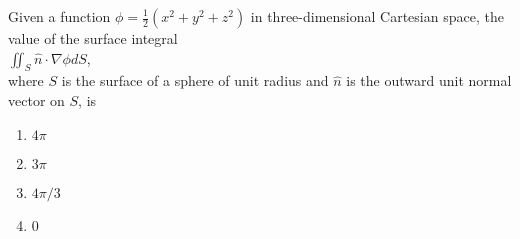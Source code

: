     \item Given a function $ \phi = \frac{1}{2}(x^{2} + y^{2} + z^{2})$ in three-dimensional Cartesian space, the value of the surface integral\\
    $\iint_{S} \hat{n} \cdot \nabla \phi dS $, \\
where $S$ is the surface of a sphere of unit radius and $\hat{n}$ is the outward unit normal vector on $S$, is
\begin{enumerate}
    \item $4\pi$
    \item $3\pi$
    \item $4\pi/3$
    \item $0$
\end{enumerate}

  



